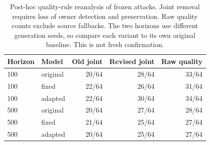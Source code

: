 \begin{table}[ht]\centering\small
\begin{tabular}{llrrr}\toprule
Horizon & Model & Old joint & Revised joint & Raw quality\\\midrule
100 & original & 20/64 & 28/64 & 33/64\\
100 & fixed & 22/64 & 26/64 & 31/64\\
100 & adapted & 22/64 & 30/64 & 34/64\\
500 & original & 20/64 & 27/64 & 28/64\\
500 & fixed & 21/64 & 25/64 & 27/64\\
500 & adapted & 20/64 & 25/64 & 27/64\\
\bottomrule\end{tabular}
\caption{Post-hoc quality-rule reanalysis of frozen attacks. Joint removal requires loss of owner detection and preservation. Raw quality counts exclude source fallbacks. The two horizons use different generation seeds, so compare each variant to its own original baseline. This is not fresh confirmation.}\end{table}
